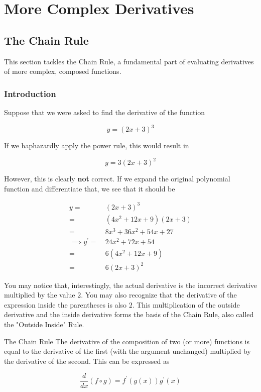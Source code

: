 \chapter{More Complex Derivatives}

\section{The Chain Rule}

This section tackles the Chain Rule, a fundamental part of evaluating derivatives of more complex, composed functions.

\subsection{Introduction}

Suppose that we were asked to find the derivative of the function

\[ y = \left( 2x + 3 \right)^3 \]

If we haphazardly apply the power rule, this would result in

\[ y = 3 \left( 2x + 3 \right)^2 \]

However, this is clearly \textbf{not} correct. If we expand the original polynomial function and differentiate that, we see that it should be

\begin{align}
    y = \> &\left( 2x + 3 \right)^3 \\
    = \> &\left( 4x^2 + 12x + 9 \right) \left( 2x + 3 \right) \\
    = \> &8x^3 + 36x^2 + 54x + 27 \\
    \implies y^\prime = \> &24x^2 + 72x + 54 \\
    = \> &6 \left( 4x^2 + 12x + 9 \right) \\
    = \> &6 \left( 2x + 3 \right)^2
\end{align}

You may notice that, interestingly, the actual derivative is the incorrect derivative multiplied by the value \( 2 \). You may also recognize that the derivative of the expression inside the parentheses is also \( 2 \). This multiplication of the outside derivative and the inside derivative forms the basis of the Chain Rule, also called the "Outside Inside" Rule.

\begin{definition}{The Chain Rule}
    The derivative of the composition of two (or more) functions is equal to the derivative of the first (with the argument unchanged) multiplied by the derivative of the second. This can be expressed as
    
    \[ \dfrac{d}{dx} \left( f \circ g \right) = f^\prime \left( g \left( x \right) \right) g^\prime \left( x \right) \]
\end{definition}

